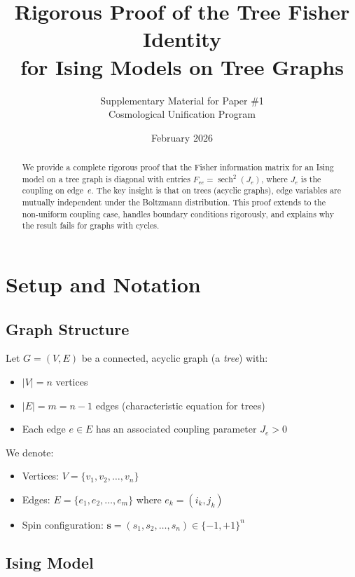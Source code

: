 \documentclass[11pt]{article}
\title{Rigorous Proof of the Tree Fisher Identity\\
for Ising Models on Tree Graphs}
\author{Supplementary Material for Paper \#1\\
Cosmological Unification Program}
\date{February 2026}
\theoremstyle{definition}
\theoremstyle{remark}
\begin{document}
\maketitle

\begin{abstract}
We provide a complete rigorous proof that the Fisher information matrix
for an Ising model on a tree graph is diagonal with entries
$F_{ee} = \operatorname{sech}^2(J_e)$, where $J_e$ is the coupling on
edge~$e$. The key insight is that on trees (acyclic graphs), edge variables
are mutually independent under the Boltzmann distribution. This proof
extends to the non-uniform coupling case, handles boundary conditions
rigorously, and explains why the result fails for graphs with cycles.
\end{abstract}

\section{Setup and Notation}

\subsection{Graph Structure}

Let $G = (V, E)$ be a connected, acyclic graph (a \emph{tree}) with:
\begin{itemize}
\item $|V| = n$ vertices
\item $|E| = m = n - 1$ edges (characteristic equation for trees)
\item Each edge $e \in E$ has an associated coupling parameter $J_e > 0$
\end{itemize}

We denote:
\begin{itemize}
\item Vertices: $V = \{v_1, v_2, \ldots, v_n\}$
\item Edges: $E = \{e_1, e_2, \ldots, e_m\}$ where $e_k = (i_k, j_k)$
\item Spin configuration: $\mathbf{s} = (s_1, s_2, \ldots, s_n) \in \{-1, +1\}^n$
\end{itemize}

\subsection{Ising Model}
\end{document}
